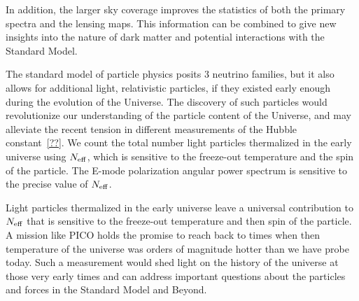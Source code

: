 \documentclass[PICOReport.tex]{subfiles}
\begin{document}
In addition, the larger sky coverage improves the statistics of both the primary spectra and the lensing maps.  
This information can be combined to give new insights into the nature of dark matter and potential interactions 
with the Standard Model. 

The standard model of particle physics posits 3 neutrino families, but it also allows for additional light, relativistic particles, if 
they existed early enough during the evolution of the Universe. The discovery of such particles would revolutionize 
our understanding of the particle content of the Universe, 
and may alleviate the recent tension in different measurements of the Hubble constant~\ref{??}.  We count the total number 
light particles thermalized in the early universe using ${N_{\rm eff}}$, which is sensitive to the freeze-out temperature and 
the spin of the particle. The E-mode polarization angular power spectrum is sensitive to the precise value of ${N_{\rm eff}}$.  

Light particles thermalized in the early universe leave a universal contribution to ${N_{\rm eff}}$ that is sensitive to the 
freeze-out temperature and then spin of the particle.  A mission like PICO holds the promise to reach 
back to times when then temperature of the universe was orders of magnitude hotter than we have probe today.  
Such a measurement would shed light on the history of the universe at those very early times and can address 
important questions about the particles and forces in the Standard Model and Beyond.

\end{document}

